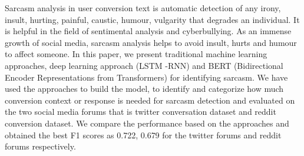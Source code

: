 Sarcasm analysis in user conversion text is automatic detection of any irony, insult, hurting, painful, caustic, humour, vulgarity that degrades an individual. It is helpful in the field of sentimental analysis and cyberbullying. As an immense growth of social media, sarcasm analysis helps to avoid insult, hurts and humour to affect someone. In this paper, we present traditional machine learning approaches, deep learning approach (LSTM -RNN) and BERT (Bidirectional Encoder Representations from Transformers) for identifying sarcasm. We have used the approaches to build the model, to identify and categorize how much conversion context or response is needed for sarcasm detection and evaluated on the two social media forums that is twitter conversation dataset and reddit conversion dataset. We compare the performance based on the approaches and obtained the best F1 scores as 0.722, 0.679 for the twitter forums and reddit forums respectively.
